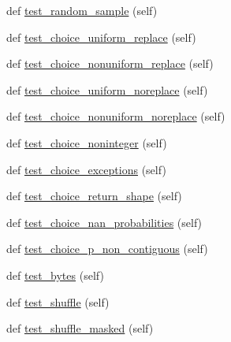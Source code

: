 \begin{DoxyCompactItemize}
\item 
def \hyperlink{classnumpy_1_1random_1_1tests_1_1test__randomstate_1_1TestRandomDist_abca3751bc1516038c72312dc0949f684}{test\+\_\+random\+\_\+sample} (self)
\item 
def \hyperlink{classnumpy_1_1random_1_1tests_1_1test__randomstate_1_1TestRandomDist_a085435eedb7185ca733269cf0110de74}{test\+\_\+choice\+\_\+uniform\+\_\+replace} (self)
\item 
def \hyperlink{classnumpy_1_1random_1_1tests_1_1test__randomstate_1_1TestRandomDist_a4c1783fb31697cc402ebf101eab3e8f7}{test\+\_\+choice\+\_\+nonuniform\+\_\+replace} (self)
\item 
def \hyperlink{classnumpy_1_1random_1_1tests_1_1test__randomstate_1_1TestRandomDist_ae2b222da7397339859e0c94adbaf6371}{test\+\_\+choice\+\_\+uniform\+\_\+noreplace} (self)
\item 
def \hyperlink{classnumpy_1_1random_1_1tests_1_1test__randomstate_1_1TestRandomDist_afe4a7e19ab9af5d8f742e97b1347d0e1}{test\+\_\+choice\+\_\+nonuniform\+\_\+noreplace} (self)
\item 
def \hyperlink{classnumpy_1_1random_1_1tests_1_1test__randomstate_1_1TestRandomDist_a0c8b1cf8fe06955098f80a30143ff0e4}{test\+\_\+choice\+\_\+noninteger} (self)
\item 
def \hyperlink{classnumpy_1_1random_1_1tests_1_1test__randomstate_1_1TestRandomDist_adb7452747b289b623fee33c6534ac15f}{test\+\_\+choice\+\_\+exceptions} (self)
\item 
def \hyperlink{classnumpy_1_1random_1_1tests_1_1test__randomstate_1_1TestRandomDist_a91970bdd33e42a6b32e37766c1a12ab5}{test\+\_\+choice\+\_\+return\+\_\+shape} (self)
\item 
def \hyperlink{classnumpy_1_1random_1_1tests_1_1test__randomstate_1_1TestRandomDist_ad86b9b446fc191689238026a5998ec37}{test\+\_\+choice\+\_\+nan\+\_\+probabilities} (self)
\item 
def \hyperlink{classnumpy_1_1random_1_1tests_1_1test__randomstate_1_1TestRandomDist_af112c51f1e0108d6e9c547c2e357bb36}{test\+\_\+choice\+\_\+p\+\_\+non\+\_\+contiguous} (self)
\item 
def \hyperlink{classnumpy_1_1random_1_1tests_1_1test__randomstate_1_1TestRandomDist_aa41bdbfb45d6b028718acb3e9abf8ff3}{test\+\_\+bytes} (self)
\item 
def \hyperlink{classnumpy_1_1random_1_1tests_1_1test__randomstate_1_1TestRandomDist_a4e9a7b3792c2359ce6b2ac9692adcb60}{test\+\_\+shuffle} (self)
\item 
def \hyperlink{classnumpy_1_1random_1_1tests_1_1test__randomstate_1_1TestRandomDist_aa1b9425f7e7d4c95e46c81702f798820}{test\+\_\+shuffle\+\_\+masked} (self)

\end{DoxyCompactItemize}
